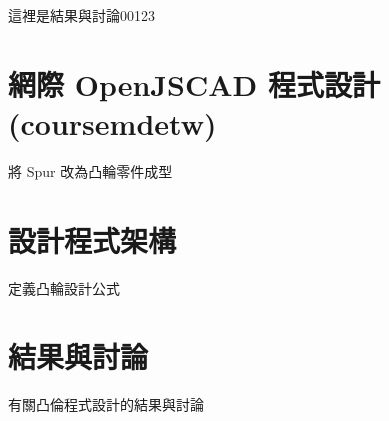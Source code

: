 \documentclass[]{article}
\begin{document}
這裡是結果與討論00123

\section{網際 OpenJSCAD
程式設計(coursemdetw)}\label{ux7db2ux969b-openjscad-ux7a0bux5f0fux8a2dux8a08coursemdetw}

將 Spur 改為凸輪零件成型

\section{設計程式架構}\label{ux8a2dux8a08ux7a0bux5f0fux67b6ux69cb}

定義凸輪設計公式

\section{結果與討論}\label{ux7d50ux679cux8207ux8a0eux8ad6-13}

有關凸倫程式設計的結果與討論
\end{document}
